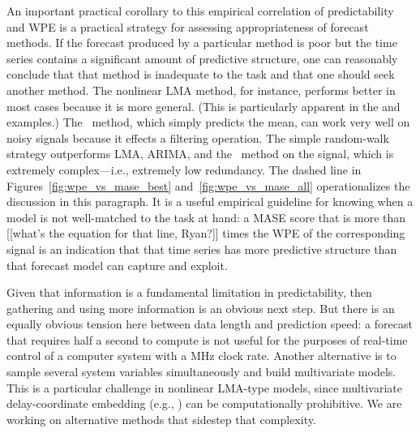An important practical corollary to this empirical correlation of
predictability and WPE is a practical strategy for assessing
appropriateness of forecast methods.  If the forecast produced by a
particular method is poor but the time series contains a significant
amount of predictive structure, one can reasonably conclude that that
method is inadequate to the task and that one should seek another
method.  The nonlinear LMA method, for instance, performs better in
most cases because it is more general.  (This is particularly apparent
in the \col and \svdfive examples.)
The \naive ~method, which simply predicts the mean, can work very well
on noisy signals because it effects a filtering operation.  The simple
random-walk strategy outperforms LMA, ARIMA, and the \naive ~method on
the \gcc signal, which is extremely complex---i.e., extremely low
redundancy.
The dashed line in Figures~\ref{fig:wpe_vs_mase_best}
and~\ref{fig:wpe_vs_mase_all} operationalizes the discussion in this
paragraph.  It is a useful empirical guideline for knowing when a
model is not well-matched to the task at hand: a MASE score that is
more than {\color{red}[[what's the equation for that line, Ryan?]]}
times the WPE of the corresponding signal is an indication that that
time series has more predictive structure than that forecast model can
capture and exploit.

Given that information is a fundamental limitation in predictability,
then gathering and using more information is an obvious next step.
But there is an equally obvious tension here between data length and
prediction speed: a forecast that requires half a second to compute is
not useful for the purposes of real-time control of a computer system
with a MHz clock rate.  Another alternative is to sample several
system variables simultaneously and build multivariate models.  This
is a particular challenge in nonlinear LMA-type models, since
multivariate delay-coordinate embedding (e.g.,
\cite{cao-multivariate-embedding,deyle-sugihara2011}) can be
computationally prohibitive.  We are working on alternative methods
that sidestep that complexity.


